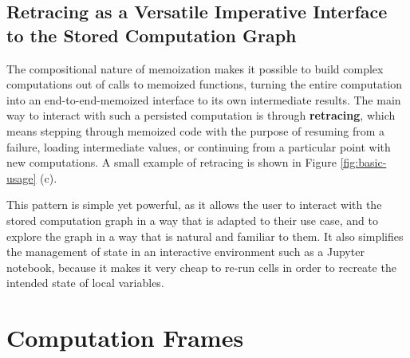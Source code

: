 \documentclass{article} %
\begin{document}
\subsection{Retracing as a Versatile Imperative Interface to the Stored Computation Graph}
\label{subsection:retracing}

The compositional nature of memoization makes it possible to build complex
computations out of calls to memoized functions, turning the entire computation
into an end-to-end-memoized interface to its own intermediate results. The main
way to interact with such a persisted computation is through \textbf{retracing},
which means stepping through memoized code with the purpose of resuming from a
failure, loading intermediate values, or continuing from a particular point with
new computations. A small example of retracing is shown in Figure
\ref{fig:basic-usage} (c). 

This pattern is simple yet powerful, as it allows the user to interact with the
stored computation graph in a way that is adapted to their use case, and to
explore the graph in a way that is natural and familiar to them. It also
simplifies the management of state in an interactive environment such as a
Jupyter notebook, because it makes it very cheap to re-run cells in order to recreate the intended state of local variables.

\section{Computation Frames}
\label{section:cf}
\end{document}
